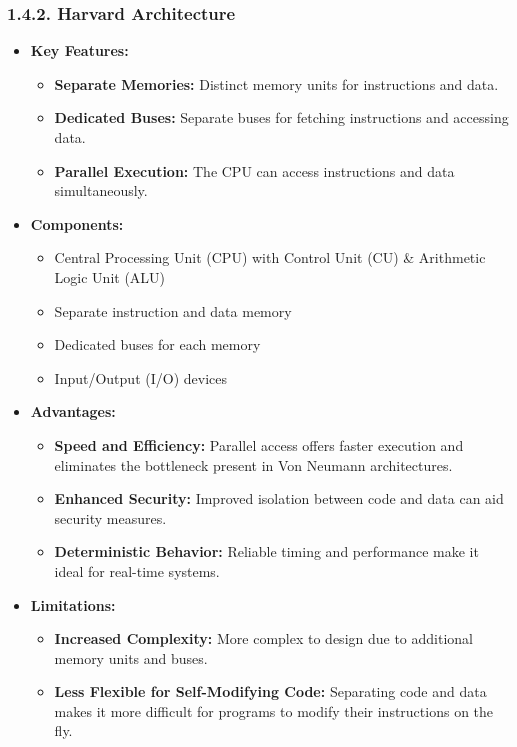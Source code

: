 \documentclass[
]{article}
\begin{document}
\hypertarget{142-harvard-architecture}{%
\subsubsection{1.4.2. Harvard
Architecture}\label{142-harvard-architecture}}

\begin{itemize}
\item
  \textbf{Key Features:}

  \begin{itemize}
  \item
    \textbf{Separate Memories:} Distinct memory units for instructions
    and data.
  \item
    \textbf{Dedicated Buses:} Separate buses for fetching instructions
    and accessing data.
  \item
    \textbf{Parallel Execution:} The CPU can access instructions and
    data simultaneously.
  \end{itemize}
\item
  \textbf{Components:}

  \begin{itemize}
  \item
    Central Processing Unit (CPU) with Control Unit (CU) \& Arithmetic
    Logic Unit (ALU)
  \item
    Separate instruction and data memory
  \item
    Dedicated buses for each memory
  \item
    Input/Output (I/O) devices
  \end{itemize}
\item
  \textbf{Advantages:}

  \begin{itemize}
  \item
    \textbf{Speed and Efficiency:} Parallel access offers faster
    execution and eliminates the bottleneck present in Von Neumann
    architectures.
  \item
    \textbf{Enhanced Security:} Improved isolation between code and data
    can aid security measures.
  \item
    \textbf{Deterministic Behavior:} Reliable timing and performance
    make it ideal for real-time systems.
  \end{itemize}
\item
  \textbf{Limitations:}

  \begin{itemize}
  \item
    \textbf{Increased Complexity:} More complex to design due to
    additional memory units and buses.
  \item
    \textbf{Less Flexible for Self-Modifying Code:} Separating code and
    data makes it more difficult for programs to modify their
    instructions on the fly.
  \end{itemize}
\end{itemize}
\end{document}
